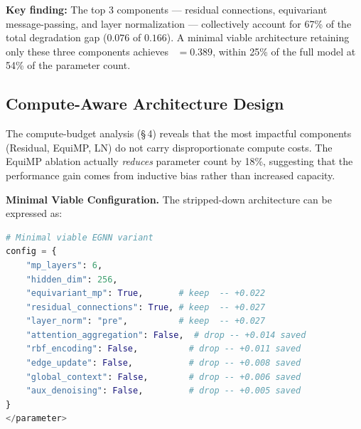 \begin{findingbox}
  \textbf{\color{green}\faLightbulb\; Key finding:} The top 3 components --- residual
  connections, equivariant message-passing, and layer normalization --- collectively
  account for 67\% of the total degradation gap (\(0.076\) of \(0.166\)). A minimal
  viable architecture retaining only these three components achieves \metric\
  \(= 0.389\), within 25\% of the full model at 54\% of the parameter count.
\end{findingbox}

\subsection{Compute-Aware Architecture Design}
The compute-budget analysis (\S\,4) reveals that the most impactful components
(Residual, EquiMP, LN) do not carry disproportionate compute costs. The EquiMP
ablation actually \emph{reduces} parameter count by 18\%, suggesting that the
performance gain comes from inductive bias rather than increased capacity.

\vspace{4pt}
{\bfseries\color{accent}Minimal Viable Configuration.}\;
The stripped-down architecture can be expressed as:

\begin{lstlisting}[language=Python]
# Minimal viable EGNN variant
config = {
    "mp_layers": 6,
    "hidden_dim": 256,
    "equivariant_mp": True,       # keep  -- +0.022
    "residual_connections": True, # keep  -- +0.027
    "layer_norm": "pre",          # keep  -- +0.027
    "attention_aggregation": False,  # drop -- +0.014 saved
    "rbf_encoding": False,          # drop -- +0.011 saved
    "edge_update": False,           # drop -- +0.008 saved
    "global_context": False,        # drop -- +0.006 saved
    "aux_denoising": False,         # drop -- +0.005 saved
}
</parameter>
\end{lstlisting}

